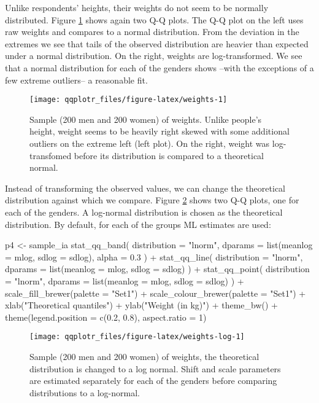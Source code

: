 Unlike respondents' heights, their weights do not seem to be normally
distributed. Figure \ref{fig:weights} shows again two Q-Q plots. The Q-Q
plot on the left uses raw weights and compares to a normal distribution.
From the deviation in the extremes we see that tails of the observed
distribution are heavier than expected under a normal distribution. On
the right, weights are log-transformed. We see that a normal
distribution for each of the genders shows --with the exceptions of a
few extreme outliers-- a reasonable fit.

\begin{Schunk}
\begin{figure}

{\centering \texttt{[image: qqplotr\_files/figure-latex/weights-1]} 

}

\caption[Sample (200 men and 200 women) of weights]{Sample (200 men and 200 women) of weights. Unlike people's height, weight seems to be heavily right skewed with some additional outliers on the extreme left (left plot). On the right, weight was log-transfomed before its distribution is compared to a theoretical normal. }\label{fig:weights}
\end{figure}
\end{Schunk}

Instead of transforming the observed values, we can change the
theoretical distribution against which we compare. Figure
\ref{fig:weights-log} shows two Q-Q plots, one for each of the genders.
A log-normal distribution is chosen as the theoretical distribution. By
default, for each of the groups ML estimates are used:

\begin{Schunk}
\begin{Sinput}
p4 <- sample_ia %>% ggplot(aes(sample = WTKG3 / 100, colour = Gender, fill = Gender)) + geom_abline(colour = "grey60") +
  stat_qq_band(
    distribution = "lnorm",
    dparams = list(meanlog = mlog, sdlog = sdlog),
    alpha = 0.3
  ) +
  stat_qq_line(
    distribution = "lnorm",
    dparams = list(meanlog = mlog, sdlog = sdlog)
  ) +
  stat_qq_point(
    distribution = "lnorm",
    dparams = list(meanlog = mlog, sdlog = sdlog)
  ) +
  scale_fill_brewer(palette = "Set1") +
  scale_colour_brewer(palette = "Set1") +
  xlab("Theoretical quantiles") +
  ylab("Weight (in kg)") +
  theme_bw() + 
  theme(legend.position = c(0.2, 0.8), aspect.ratio = 1) 
\end{Sinput}
\begin{figure}

{\centering \texttt{[image: qqplotr\_files/figure-latex/weights-log-1]} 

}

\caption[Sample (200 men and 200 women) of weights, the theoretical distribution  is changed to a log normal]{Sample (200 men and 200 women) of weights, the theoretical distribution  is changed to a log normal. Shift and scale parameters are estimated separately for each of the genders before comparing distributions to a log-normal.}\label{fig:weights-log}
\end{figure}
\end{Schunk}

